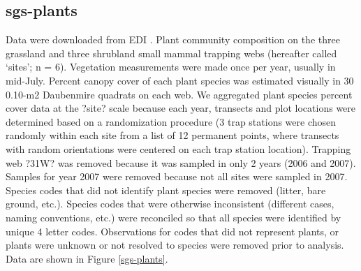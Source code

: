 \documentclass[11pt, oneside]{article}
\begin{document}
\subsection{sgs-plants}
Data were downloaded from EDI \citep{sgs-plants}.
Plant community composition on the three grassland and three shrubland small mammal trapping webs (hereafter called `sites'; n = 6). 
Vegetation measurements were made once per year, usually in mid-July. 
Percent canopy cover of each plant species was estimated visually in 30 0.10-m2 Daubenmire quadrats on each web. 
We aggregated plant species percent cover data at the ?site? scale because each year, transects and plot locations were determined based on a randomization procedure (3 trap stations were chosen randomly within each site from a list of 12 permanent points, where transects with random orientations were centered on each trap station location). 
Trapping web ?31W? was removed because it was sampled in only 2 years (2006 and 2007).
Samples for year 2007 were removed because not all sites were sampled in 2007.
Species codes that did not identify plant species were removed (litter, bare ground, etc.).
Species codes that were otherwise inconsistent (different cases, naming conventions, etc.) were reconciled so that all species were identified by unique 4 letter codes.
Observations for codes that did not represent plants, or plants were unknown or not resolved to species were removed prior to analysis.
Data are shown in Figure \ref{sgs-plants}.
\end{document}
